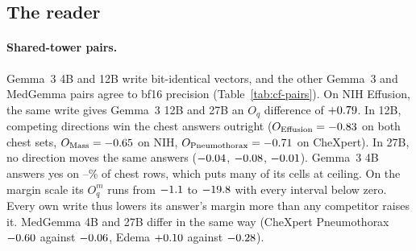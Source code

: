\documentclass[11pt]{article}
\begin{document}
\subsection{The reader}
\label{app:cf-reader}

\paragraph{Shared-tower pairs.} Gemma~3 4B and 12B write bit-identical vectors, and the other Gemma~3 and MedGemma pairs agree to bf16 precision (Table~\ref{tab:cf-pairs}). On NIH Effusion, the same write gives Gemma~3 12B and 27B an $O_q$ difference of $+0.79$. In 12B, competing directions win the chest answers outright ($O_{\mathrm{Effusion}}=-0.83$ on both chest sets, $O_{\mathrm{Mass}}=-0.65$ on NIH, $O_{\mathrm{Pneumothorax}}=-0.71$ on CheXpert). In 27B, no direction moves the same answers ($-0.04$, $-0.08$, $-0.01$). Gemma~3 4B answers yes on \cfGemmaFourYesMin--\cfGemmaFourYesMax\% of chest rows, which puts many of its cells at ceiling. On the margin scale its $O^m_q$ runs from $-1.1$ to $-19.8$ with every interval below zero. Every own write thus lowers its answer's margin more than any competitor raises it. MedGemma 4B and 27B differ in the same way (CheXpert Pneumothorax $-0.60$ against $-0.06$, Edema $+0.10$ against $-0.28$).
\end{document}

